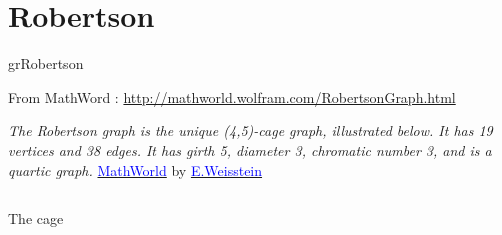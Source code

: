 \newpage\section{Robertson}\label{robertson}
\begin{NewMacroBox}{grRobertson}{}

\medskip
From MathWord : \url{http://mathworld.wolfram.com/RobertsonGraph.html} 

\medskip
\emph{The Robertson graph is the unique (4,5)-cage graph, illustrated below. It has 19 vertices and 38 edges. It has girth 5, diameter 3, chromatic number 3, and is a quartic graph.} 
\href{http://mathworld.wolfram.com/topics/GraphTheory.html}%
           {\textcolor{blue}{MathWorld}} by \href{http://en.wikipedia.org/wiki/Eric_W._Weisstein}%
           {\textcolor{blue}{E.Weisstein}}   

\end{NewMacroBox}

\subsection{}

The cage 

\medskip
\begin{center}
\begin{tkzexample}[vbox]
\end{tkzexample} 
\end{center}

\clearpage\newpage
\subsection{}


